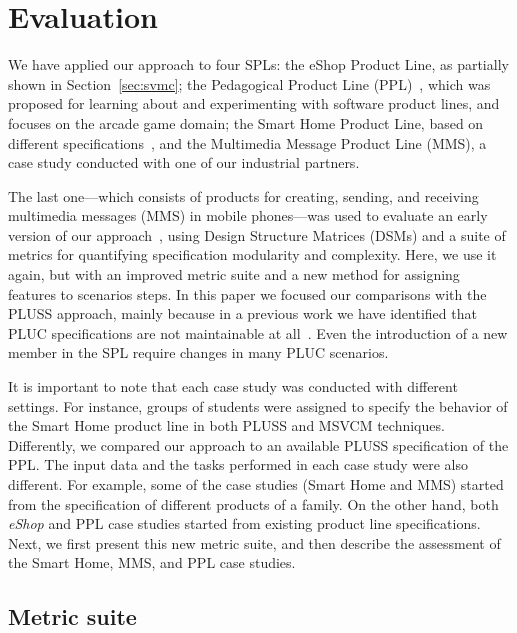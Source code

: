 \section{Evaluation}
\label{sec:evaluation}

We have applied our approach to four SPLs: the eShop Product Line, as partially
shown  in Section~\ref{sec:svmc}; the Pedagogical Product Line
(PPL)~\cite{PPL:2008}, which was proposed for learning about and experimenting
with software product lines, and focuses on the arcade game domain; the Smart
Home Product Line, based on different
specifications~\cite{Pohl:2005aa,Alferez:2008aa}, and the Multimedia Message
Product Line (MMS), a case study conducted with one of our industrial partners.

The last one---which consists of products for creating, sending, and receiving
multimedia messages (MMS) in mobile phones---was used to evaluate an early
version of our approach~\cite{Bonifacio:2008aa}, using Design Structure Matrices
(DSMs) and a suite of metrics for quantifying
specification modularity and complexity. Here, we use it again, but with an
improved metric suite and a new method for assigning features to scenarios steps. In this paper we focused our comparisons with
the PLUSS approach, mainly because in a previous work we have identified that PLUC specifications are not maintainable at all~\cite{Bonifacio:2008aa}. Even the introduction of a new member in the SPL require changes in many PLUC scenarios.

It is important to note that each case study was conducted with different
settings. For instance, groups of students were assigned to specify the behavior
of the Smart Home product line in both PLUSS and MSVCM techniques. Differently, we
compared our approach to an available PLUSS specification of the PPL. The input
data and the tasks performed in each case study were also different. For example,
some of the case studies (Smart Home and MMS) started from the specification of
different products of a family. On the other hand, both \emph{eShop} and PPL case
studies started from existing product line specifications. Next, we first present this new metric suite,
and then describe the assessment of the Smart Home, MMS, and PPL case studies. 


\subsection{Metric suite}\label{sub:metric-suite}

